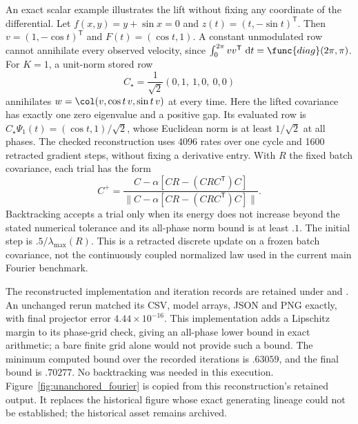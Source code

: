 An exact scalar example illustrates the lift without fixing any coordinate
of the differential. Let $f(x,y)=y+\sin x=0$ and $z(t)=(t,-\sin t)^{\mathsf{T%
}}$. Then $v=(1,-\cos t)^{\mathsf{T}}$ and $F(t)=(\cos t,1)$. A constant
unmodulated row cannot annihilate every observed velocity, since $%
\int_0^{2\pi}vv^{\mathsf{T}}\,\,\mathrm{d} t =\func{diag}(2\pi,\pi)$. For $%
K=1$, a unit-norm stored row 
\begin{equation}
C_\star=\frac1{\sqrt2}(0,1,\ 1,0,\ 0,0)  \label{eq:fourier_example}
\end{equation}
annihilates $w=\col(v,\cos t\,v,\sin t\,v)$ at every time. Here the lifted
covariance has exactly one zero eigenvalue and a positive gap. Its evaluated
row is $C_\star\Psi_1(t)=(\cos t,1)/\sqrt2$, whose Euclidean norm is at
least $1/\sqrt2$ at all phases. The checked reconstruction uses 4096 rates
over one cycle and 1600 retracted gradient steps, without fixing a derivative
entry. With $R$ the fixed batch covariance, each trial has the form
\begin{equation}
 C^+=\frac{C-\alpha[C R-(C R C^{\mathsf T})C]}
 {\|C-\alpha[C R-(C R C^{\mathsf T})C]\|}.
\end{equation}
Backtracking accepts a trial only when its energy does not increase beyond
the stated numerical tolerance and its all-phase norm bound is at least
$.1$. The initial step is $.5/\lambda_{\max}(R)$. This is a retracted
discrete update on a frozen batch covariance, not the continuously coupled
normalized law used in the current main Fourier benchmark.

The reconstructed implementation and iteration records are retained under
 and
. An unchanged rerun matched
its CSV, model arrays, JSON and PNG exactly, with final projector error
$4.44\times10^{-16}$. This implementation adds a Lipschitz margin to its
phase-grid check, giving an all-phase lower bound in exact arithmetic;
a bare finite grid alone would not provide such a bound. The minimum
computed bound over the recorded iterations is $.63059$, and the final
bound is $.70277$. No backtracking was needed in this execution.
Figure~\ref{fig:unanchored_fourier} is copied from this reconstruction's
retained output. It replaces the historical figure whose exact generating
lineage could not be established; the historical asset remains archived.

